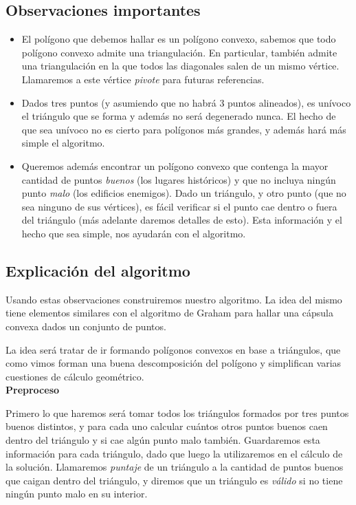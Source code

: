 \subsection{Observaciones importantes}
\begin{itemize}
\item El polígono que debemos hallar es un polígono convexo, sabemos que todo 
polígono convexo admite una triangulación. En particular, también admite una triangulación 
en la que todos las diagonales salen de un mismo vértice. Llamaremos a este vértice \textit{pivote} 
para futuras referencias. 
\item Dados tres puntos (y asumiendo que no habrá 3 puntos alineados), es unívoco el triángulo que se 
forma y además no será degenerado nunca. El hecho de que sea unívoco no es cierto para polígonos más 
grandes, y además hará más simple el algoritmo. 
\item Queremos además encontrar un polígono convexo que contenga la mayor cantidad de puntos \textit{buenos} 
(los lugares históricos) y que no incluya ningún punto \textit{malo} (los edificios enemigos). 
Dado un triángulo, y otro punto (que no sea ninguno de sus vértices), es fácil verificar si el punto 
cae dentro o fuera del triángulo (más adelante daremos detalles de esto). Esta información y el 
hecho que sea simple, nos ayudarán con el algoritmo. 
\end{itemize}

\subsection{Explicación del algoritmo}
Usando estas observaciones construiremos nuestro algoritmo. La idea del mismo tiene elementos similares 
con el algoritmo de Graham para hallar una cápsula convexa dados un conjunto de puntos. 

La idea será tratar de ir formando polígonos convexos en base a triángulos, que como vimos forman 
una buena descomposición del polígono y simplifican varias cuestiones de cálculo geométrico. \\

\textbf{Preproceso}

Primero lo que haremos será tomar todos los triángulos formados por tres puntos buenos distintos, 
y para cada uno calcular cuántos otros puntos buenos caen dentro del triángulo y si cae algún punto malo 
también. Guardaremos esta información para cada triángulo, dado que luego la utilizaremos en 
el cálculo de la solución. Llamaremos \textit{puntaje} de un triángulo a la cantidad de puntos buenos 
que caigan dentro del triángulo, y diremos que un triángulo es \textit{válido} si no tiene 
ningún punto malo en su interior. 

